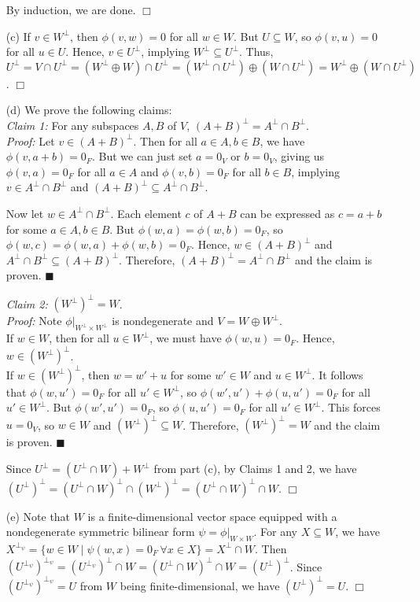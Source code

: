 \documentclass[12pt]{article}
\begin{document}
\begin{enumerate}
    By induction, we are done. \hfill $\Box$
    \item[(c)] If $v \in W^\perp$, then $\phi(v, w) = 0$ for all $w \in W$. But $U \subseteq W$, so $\phi(v, u) = 0$ for all $u \in U$. Hence, $v \in U^\perp$, implying $W^\perp \subseteq U^\perp$. Thus, $U^\perp = V \cap U^\perp = (W^\perp \oplus W) \cap U^\perp = (W^\perp \cap U^\perp) \oplus (W \cap U^\perp) = W^\perp \oplus (W \cap U^\perp)$. \hfill $\Box$
    \item[(d)] We prove the following claims: \\
    \textit{Claim 1:} For any subspaces $A, B$ of $V$, $(A + B)^\perp = A^\perp \cap B^\perp$. \\
    \textit{Proof:} Let $v \in (A + B)^\perp$. Then for all $a \in A, b \in B$, we have $\phi(v, a + b) = 0_F$. But we can just set $a = 0_V$ or $b = 0_V$, giving us $\phi(v, a) = 0_F$ for all $a \in A$ and $\phi(v, b) = 0_F$ for all $b \in B$, implying $v \in A^\perp \cap B^\perp$ and $(A + B)^\perp \subseteq A^\perp \cap B^\perp$.

    Now let $w \in A^\perp \cap B^\perp$. Each element $c$ of $A + B$ can be expressed as $c = a + b$ for some $a \in A, b \in B$. But $\phi(w, a) = \phi(w, b) = 0_F$, so $\phi(w, c) = \phi(w, a) + \phi(w, b) = 0_F$. Hence, $w \in (A + B)^\perp$ and $A^\perp \cap B^\perp \subseteq (A + B)^\perp$. Therefore, $(A + B)^\perp = A^\perp \cap B^\perp$ and the claim is proven. \hfill $\blacksquare$ 
    
    \textit{Claim 2:} $(W^\perp)^\perp = W$. \\
    \textit{Proof:} Note $\phi|_{W^\perp \times W^\perp}$ is nondegenerate and $V = W \oplus W^\perp$. \\
    If $w \in W$, then for all $u \in W^\perp$, we must have $\phi(w, u) = 0_F$. Hence, $w \in (W^\perp)^\perp$. \\
    If $w \in (W^\perp)^\perp$, then $w = w' + u$ for some $w' \in W$ and $u \in W^\perp$. It follows that $\phi(w, u') = 0_F$ for all $u' \in W^\perp$, so $\phi(w', u') + \phi(u, u') = 0_F$ for all $u' \in W^\perp$. But $\phi(w', u') = 0_F$, so $\phi(u, u') = 0_F$ for all $u' \in W^\perp$. This forces $u = 0_V$, so $w \in W$ and $(W^\perp)^\perp \subseteq W$. Therefore, $(W^\perp)^\perp = W$ and the claim is proven. \hfill $\blacksquare$

    Since $U^\perp = (U^\perp \cap W) + W^\perp$ from part (c), by Claims 1 and 2, we have $(U^\perp)^\perp = (U^\perp \cap W)^\perp \cap (W^\perp)^\perp = (U^\perp \cap W)^\perp \cap W$. \hfill $\Box$

    \item[(e)] Note that $W$ is a finite-dimensional vector space equipped with a nondegenerate symmetric bilinear form $\psi = \phi|_{W \times W}$. For any $X \subseteq W$, we have $X^{\perp_\psi} = \{w \in W \mid \psi(w, x) = 0_F \, \forall x \in X\} = X^\perp \cap W$. Then $(U^{\perp_\psi})^{\perp_\psi} = (U^{\perp_\psi})^\perp \cap W = (U^\perp \cap W)^\perp \cap W = (U^\perp)^\perp$. Since $(U^{\perp_\psi})^{\perp_\psi} = U$ from $W$ being finite-dimensional, we have $(U^\perp)^\perp = U$. \hfill $\Box$

\end{enumerate}
\end{document}
